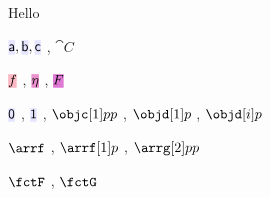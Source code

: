\documentclass[10pt,a4paper]{article}
\begin{document}
Hello

$\obj a,\obj b,\obj c$ , $\cat C$ \par
$\arr f$ , $\ntf \eta$ , $\fct F$ \par
$\obj0$ , $\obj1$ , $\objc[1]pp$ , $\objd[1]p$ , $\objd[i]p$ \par
$\arrf$ , $\arrf[1]p$ , $\arrg[2]pp$ \par
$\fctF$ , $\fctG$
\end{document}
